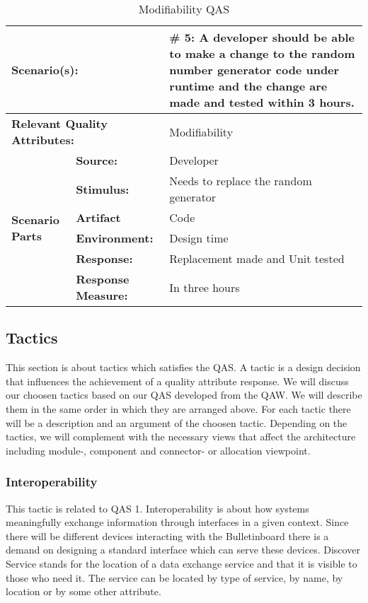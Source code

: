 \begin{table}[H]
\begin{center}
\begin{tabular}{|p{0.3cm}|p{2.5cm}|p{8cm}|}
  \hline
  \multicolumn{2}{|p{3cm}|}{\bfseries Scenario(s):} & \#  5: A developer should be able to make a change to the random number generator code under runtime and the change are made and tested within 3 hours. \\
  \hline
  \multicolumn{2}{|p{3cm}|}{\bfseries Relevant Quality Attributes:} & Modifiability\\
  \hline
  \multirow{6}{*}{\begin{sideways}{\bfseries Scenario Parts}\end{sideways}}
  & {\bfseries Source:} & Developer \\
  \cline{2-3}
  & {\bfseries Stimulus:} & Needs to replace the random generator \\
  \cline{2-3}
  & {\bfseries Artifact} &  Code \\
  \cline{2-3}
  & {\bfseries Environment:} &  Design time \\
  \cline{2-3}
  & {\bfseries Response:} &  Replacement made and Unit tested\\
  \cline{2-3}
  & {\bfseries Response Measure:} & In three hours\\
  \hline
\end{tabular}
\caption{Modifiability QAS}
\end{center}
\end{table}








\subsection{Tactics}
This section is about tactics which satisfies the QAS. A tactic is a design decision that influences the achievement of a quality attribute response. We will discuss our choosen tactics based on our QAS developed from the QAW. We will describe them in the same order in which they are arranged above. For each tactic there will be a description and an argument of the choosen tactic. Depending on the tactics, we will complement with the necessary views that affect the architecture including module-, component and connector- or allocation viewpoint. 


\noindent
\subsubsection{Interoperability} \label{sec:interoperability:restapi}
This tactic is related to QAS 1. Interoperability is about how systems meaningfully exchange information through interfaces in a given context. Since there will be different devices interacting with the Bulletinboard there is a demand on designing a standard interface which can serve these devices. Discover Service stands for the location of a data exchange service and that it is visible to those who need it. The service can be located by type of service, by name, by location or by some other attribute.

